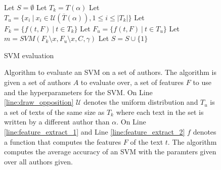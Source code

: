 \begin{figure}
    \begin{algorithm}[H]
        Let $S = \emptyset$\;
         {
            Let $T_k = T(\alpha)$\;
            Let $T_u = \{
                x_i\ |\ x_i \in \mathcal{U}\left(
                    \overline{T}(\alpha)
                \right), 1 \leq i \leq \left| T_k \right|
            \}$\;
            \label{line:draw_opposition}
            Let $F_k = \{ f(t, F)\ |\ t \in T_k\}$\;
            \label{line:feature_extract_1}
            Let $F_u = \{ f(t, F)\ |\ t \in T_u\}$\;
            \label{line:feature_extract_2}
             {
                Let $m = SVM(F_k \setminus x, F_u \setminus x, C, \gamma)$\;
                 {
                    Let $S = S \cup \{1\}$\;
                } 
            }
        }
        \caption{SVM evaluation}
    \end{algorithm}
    \caption{Algorithm to evaluate an SVM on a set of authors. The algorithm is
        given a set of authors $A$ to evaluate over, a set of features $F$ to
        use and the hyperparameters for the SVM. On Line
        \ref{line:draw_opposition} $\mathcal{U}$ denotes the uniform
        distribution and $T_u$ is a set of texts of the same size as $T_k$ where
        each text in the set is written by a different author than $\alpha$. On
        Line \ref{line:feature_extract_1} and Line \ref{line:feature_extract_2}
        $f$ denotes a function that computes the features $F$ of the text $t$.
        The algorithm computes the average accuracy of an SVM with the paramters
        given over all authors given.}
    \label{fig:svm_evaluation_algorithm}
\end{figure}

